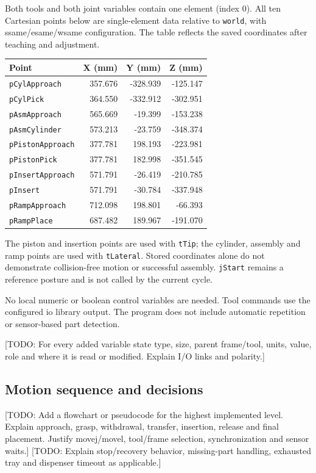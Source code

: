 \documentclass[12pt]{article}
\newcommand{\pending}[1]{\textcolor{blue!65!black}{[TODO: #1]}}
\begin{document}
Both tools and both joint variables contain one element (index 0). All ten Cartesian points below are single-element data relative to \texttt{world}, with ssame/esame/wsame configuration. The table reflects the saved coordinates after teaching and adjustment.
\begin{center}
\small
\begin{tabular}{lrrr}
\toprule
Point & X (mm) & Y (mm) & Z (mm)\\
\midrule
\texttt{pCylApproach} & 357.676 & -328.939 & -125.147\\
\texttt{pCylPick} & 364.550 & -332.912 & -302.951\\
\texttt{pAsmApproach} & 565.669 & -19.399 & -153.238\\
\texttt{pAsmCylinder} & 573.213 & -23.759 & -348.374\\
\texttt{pPistonApproach} & 377.781 & 198.193 & -223.981\\
\texttt{pPistonPick} & 377.781 & 182.998 & -351.545\\
\texttt{pInsertApproach} & 571.791 & -26.419 & -210.785\\
\texttt{pInsert} & 571.791 & -30.784 & -337.948\\
\texttt{pRampApproach} & 712.098 & 198.801 & -66.393\\
\texttt{pRampPlace} & 687.482 & 189.967 & -191.070\\
\bottomrule
\end{tabular}
\end{center}
The piston and insertion points are used with \texttt{tTip}; the cylinder, assembly and ramp points are used with \texttt{tLateral}. Stored coordinates alone do not demonstrate collision-free motion or successful assembly. \texttt{jStart} remains a reference posture and is not called by the current cycle.

No local numeric or boolean control variables are needed. Tool commands use the configured io library output. The program does not include automatic repetition or sensor-based part detection.

\pending{For every added variable state type, size, parent frame/tool, units, value, role and where it is read or modified. Explain I/O links and polarity.}

\subsection{Motion sequence and decisions}
\pending{Add a flowchart or pseudocode for the highest implemented level. Explain approach, grasp, withdrawal, transfer, insertion, release and final placement. Justify movej/movel, tool/frame selection, synchronization and sensor waits.}
\pending{Explain stop/recovery behavior, missing-part handling, exhausted tray and dispenser timeout as applicable.}
\end{document}
